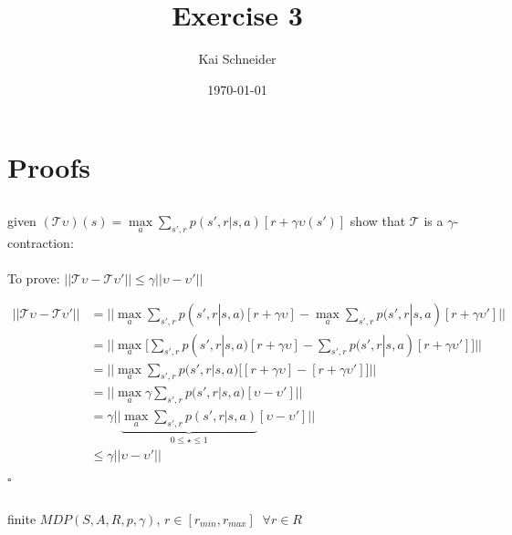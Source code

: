 \documentclass[11pt,a4paper]{article}
\title{Exercise 3}
\author{Kai Schneider}
\date{\today}
\begin{document}
 

\maketitle


\section{Proofs}

\subsection{}

given $(\mathcal{T}\upsilon)(s)= \underset{a}{\max}\sum_{s', r}p(s',r|s,a)[r+\gamma\upsilon(s')]$
show that $\mathcal{T}$ is a $\gamma$-contraction:\\\\
To prove: $|| \mathcal{T}\upsilon - \mathcal{T}\upsilon' || \leqslant \gamma|| \upsilon - \upsilon'||$

\begin{align*}
    || \mathcal{T}\upsilon - \mathcal{T}\upsilon' || 
    &= || \underset{a}{\max}\sum_{s', r}p(s',r|s,a)[r+\gamma\upsilon]
        - \underset{a}{\max}\sum_{s', r}p(s',r|s,a)[r+\gamma\upsilon']||\\
    &= || \underset{a}{\max} \biggl[ \sum_{s', r}p(s',r|s,a)[r+\gamma\upsilon]
        - \sum_{s', r}p(s',r|s,a)[r+\gamma\upsilon'] \biggr]||\\
    &= || \underset{a}{\max} \sum_{s', r}p(s',r|s,a)\biggl[ [r+\gamma\upsilon]
        - [r+\gamma\upsilon'] \biggr]||\\
    &= || \underset{a}{\max} \gamma \sum_{s', r}p(s',r|s,a)[\upsilon - \upsilon']||\\
    &= \gamma || \underbrace{\underset{a}{\max} \sum_{s', r}p(s',r|s,a)}_{0 \leq \star \leq 1} [\upsilon - \upsilon']||\\
    &\leq \gamma|| \upsilon - \upsilon'||
\end{align*}

\flushright $\square$ 
\flushleft

\subsection{}

finite $MDP(S,A,R,p,\gamma)$, $r\in[r_{min}, r_{max}] \;\; \forall r\in R$

\subsubsection{}
\end{document}
